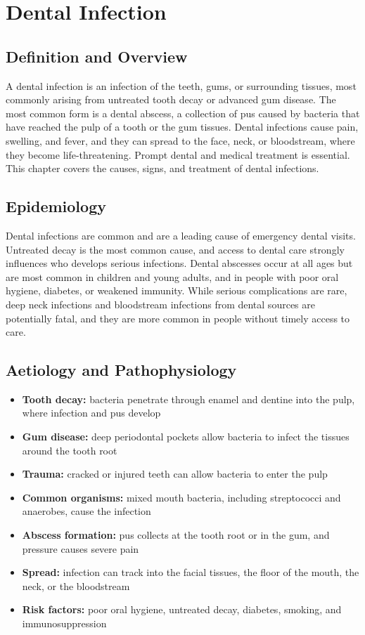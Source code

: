 \chapter{Dental Infection}

\section*{Definition and Overview}
A dental infection is an infection of the teeth, gums, or surrounding tissues, most commonly arising from untreated tooth decay or advanced gum disease. The most common form is a dental abscess, a collection of pus caused by bacteria that have reached the pulp of a tooth or the gum tissues. Dental infections cause pain, swelling, and fever, and they can spread to the face, neck, or bloodstream, where they become life-threatening. Prompt dental and medical treatment is essential. This chapter covers the causes, signs, and treatment of dental infections.

\section*{Epidemiology}
Dental infections are common and are a leading cause of emergency dental visits. Untreated decay is the most common cause, and access to dental care strongly influences who develops serious infections. Dental abscesses occur at all ages but are most common in children and young adults, and in people with poor oral hygiene, diabetes, or weakened immunity. While serious complications are rare, deep neck infections and bloodstream infections from dental sources are potentially fatal, and they are more common in people without timely access to care.

\section*{Aetiology and Pathophysiology}
\begin{itemize}
    \item \textbf{Tooth decay:} bacteria penetrate through enamel and dentine into the pulp, where infection and pus develop
    \item \textbf{Gum disease:} deep periodontal pockets allow bacteria to infect the tissues around the tooth root
    \item \textbf{Trauma:} cracked or injured teeth can allow bacteria to enter the pulp
    \item \textbf{Common organisms:} mixed mouth bacteria, including streptococci and anaerobes, cause the infection
    \item \textbf{Abscess formation:} pus collects at the tooth root or in the gum, and pressure causes severe pain
    \item \textbf{Spread:} infection can track into the facial tissues, the floor of the mouth, the neck, or the bloodstream
    \item \textbf{Risk factors:} poor oral hygiene, untreated decay, diabetes, smoking, and immunosuppression
\end{itemize}

